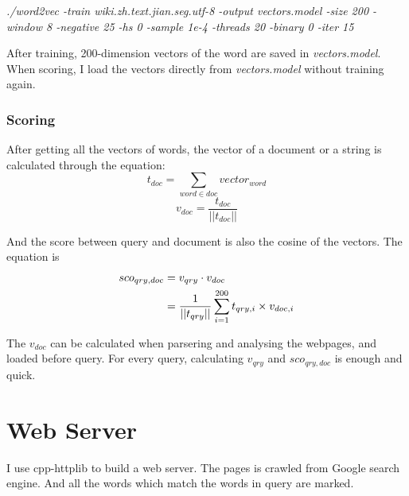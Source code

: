 \documentclass[a4paper]{article}
\begin{document}
\begin{center}
\emph{./word2vec -train wiki.zh.text.jian.seg.utf-8 -output vectors.model -size 200 -window 8 -negative 25 -hs 0 -sample 1e-4 -threads 20 -binary 0 -iter 15}
\end{center}

After training, 200-dimension vectors of the word are saved in \emph{vectors.model}. When scoring, I load the vectors directly from \emph{vectors.model} without training again.

\subsubsection{Scoring}

After getting all the vectors of words, the vector of a document or a string is calculated through the equation:$$t_{doc}=\sum_{word\in doc}vector_{word}$$$$v_{doc}=\frac{t_{doc}}{||t_{doc}||}$$

And the score between query and document is also the cosine of the vectors. The equation is
\begin{equation}
\begin{aligned}
sco_{qry,doc} & =v_{qry}\cdot v_{doc} \\
& =\frac{1}{||t_{qry}||}\sum_{i=1}^{200}t_{qry,i}\times v_{doc,i} \notag
\end{aligned}
\end{equation}

The $v_{doc}$ can be calculated when parsering and analysing the webpages, and loaded before query. For every query, calculating $v_{qry}$ and $sco_{qry,doc}$ is enough and quick.


\section{Web Server}

I use cpp-httplib to build a web server. The pages is crawled from Google search engine. And all the words which match the words in query are marked.
\end{document}
